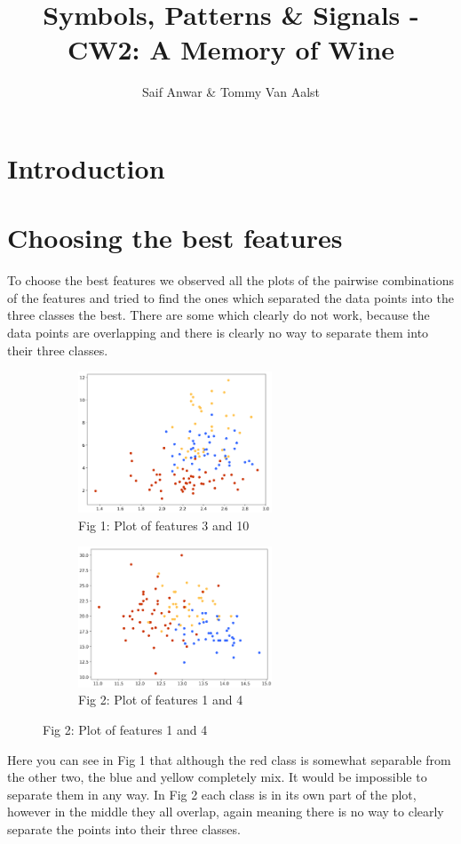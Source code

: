 \documentclass[10pt]{article}
\begin{document}
\title{Symbols, Patterns \& Signals - CW2: A Memory of Wine}
\author{Saif Anwar \& Tommy Van Aalst}
\date{}
\maketitle


\section*{Introduction}
\section*{Choosing the best features}

To choose the best features we observed all the plots of the pairwise combinations of the features and tried to find the ones which separated the data points into the three classes the best.
There are some which clearly do not work, because the data points are overlapping and there is clearly no way to separate them into their three classes.

\begin{figure}[h!]
\captionsetup[subfigure]{labelformat=empty}
\begin{subfigure}{.5\textwidth}
\centering
\includegraphics[height=4.2cm]{3and10.png}
\caption{Fig 1: Plot of features 3 and 10}
\end{subfigure}%
\begin{subfigure}{.5\textwidth}
\centering
\includegraphics[height=4.2cm]{1and4.png}
\caption{Fig 2: Plot of features 1 and 4}
\end{subfigure}%
\end{figure}
\noindent
Here you can see in Fig 1 that although the red class is somewhat separable from the other two, the blue and yellow completely mix. It would be impossible to separate them in any way. In Fig 2 each class is in its own part of the plot, however in the middle they all overlap, again meaning there is no way to clearly separate the points into their three classes.\\
\end{document}
